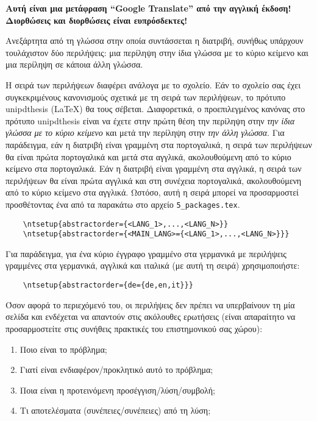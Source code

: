 
%

\textbf{Αυτή είναι μια μετάφραση “Google Translate” από την αγγλική έκδοση! Διορθώσεις και διορθώσεις είναι ευπρόσδεκτες!}

Ανεξάρτητα από τη γλώσσα στην οποία συντάσσεται η διατριβή, συνήθως υπάρχουν τουλάχιστον δύο περιλήψεις: μια περίληψη στην ίδια γλώσσα με το κύριο κείμενο και μια περίληψη σε κάποια άλλη γλώσσα.

Η σειρά των περιλήψεων διαφέρει ανάλογα με το σχολείο. Εάν το σχολείο σας έχει συγκεκριμένους κανονισμούς σχετικά με τη σειρά των περιλήψεων, το πρότυπο \gls{unipdthesis} (\LaTeX) θα τους σέβεται. Διαφορετικά, ο προεπιλεγμένος κανόνας στο πρότυπο \gls{unipdthesis} είναι να έχετε στην πρώτη θέση την περίληψη στην \emph{την ίδια γλώσσα με το κύριο κείμενο} και μετά την περίληψη στην \emph{την άλλη γλώσσα}. Για παράδειγμα, εάν η διατριβή είναι γραμμένη στα πορτογαλικά, η σειρά των περιλήψεων θα είναι πρώτα πορτογαλικά και μετά στα αγγλικά, ακολουθούμενη από το κύριο κείμενο στα πορτογαλικά. Εάν η διατριβή είναι γραμμένη στα αγγλικά, η σειρά των περιλήψεων θα είναι πρώτα αγγλικά και στη συνέχεια πορτογαλικά, ακολουθούμενη από το κύριο κείμενο στα αγγλικά.
%
Ωστόσο, αυτή η σειρά μπορεί να προσαρμοστεί προσθέτοντας ένα από τα παρακάτω στο αρχείο \verb+5_packages.tex+.

\begin{verbatim}
    \ntsetup{abstractorder={<LANG_1>,...,<LANG_N>}}
    \ntsetup{abstractorder={<MAIN_LANG>={<LANG_1>,...,<LANG_N>}}}
\end{verbatim}

Για παράδειγμα, για ένα κύριο έγγραφο γραμμένο στα γερμανικά με περιλήψεις γραμμένες στα γερμανικά, αγγλικά και ιταλικά (με αυτή τη σειρά) χρησιμοποιήστε:
\begin{verbatim}
    \ntsetup{abstractorder={de={de,en,it}}}
\end{verbatim}

Όσον αφορά το περιεχόμενό του, οι περιλήψεις δεν πρέπει να υπερβαίνουν τη μία σελίδα και ενδέχεται να απαντούν στις ακόλουθες ερωτήσεις (είναι απαραίτητο να προσαρμοστείτε στις συνήθεις πρακτικές του επιστημονικού σας χώρου):

\begin{enumerate}
  \item Ποιο είναι το πρόβλημα;
  \item Γιατί είναι ενδιαφέρον/προκλητικό αυτό το πρόβλημα;
  \item Ποια είναι η προτεινόμενη προσέγγιση/λύση/συμβολή;
  \item Τι αποτελέσματα (συνέπειες/συνέπειες) από τη λύση;
\end{enumerate}

